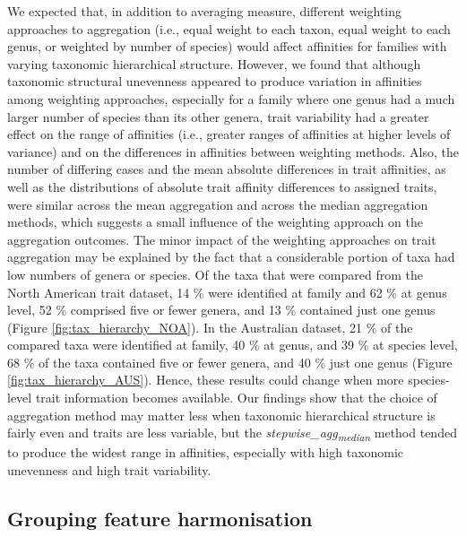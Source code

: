 \documentclass{article}
\begin{document}
We expected that, in addition to averaging measure, different weighting approaches to aggregation (i.e., equal weight to each taxon, equal weight to each genus, or weighted by number of species) would affect affinities for families with varying taxonomic hierarchical structure. 
However, we found that although taxonomic structural unevenness appeared to produce variation in affinities among weighting approaches, especially for a family where one genus had a much larger number of species than its other genera, trait variability had a greater effect on the range of affinities (i.e., greater ranges of affinities at higher levels of variance) and on the differences in affinities between weighting methods. Also, the number of differing cases and the mean absolute differences in trait affinities, as well as the distributions of absolute trait affinity differences to assigned traits, were similar across the mean aggregation and across the median aggregation methods, which suggests a small influence of the weighting approach on the aggregation outcomes. The minor impact of the weighting approaches on trait aggregation may be explained by the fact that a considerable portion of taxa had low numbers of genera or species. Of the taxa that were compared from the North American trait dataset, 14 \% were identified at family and 62 \% at genus level, 52 \% comprised five or fewer genera, and 13 \% contained just one genus (Figure \ref{fig:tax_hierarchy_NOA}). In the Australian dataset, 21 \% of the compared taxa were identified at family, 40 \% at genus, and 39 \% at species level, 68 \% of the taxa contained five or fewer genera, and 40 \% just one genus (Figure \ref{fig:tax_hierarchy_AUS}). Hence, these results could change when more species-level trait information becomes available. Our findings show that the choice of aggregation method may matter less when taxonomic hierarchical structure is fairly even and traits are less variable, but the \textit{stepwise\_agg\textsubscript{median}} method tended to produce the widest range in affinities, especially with high taxonomic unevenness and high trait variability. 

\subsection*{Grouping feature harmonisation}
\end{document}
